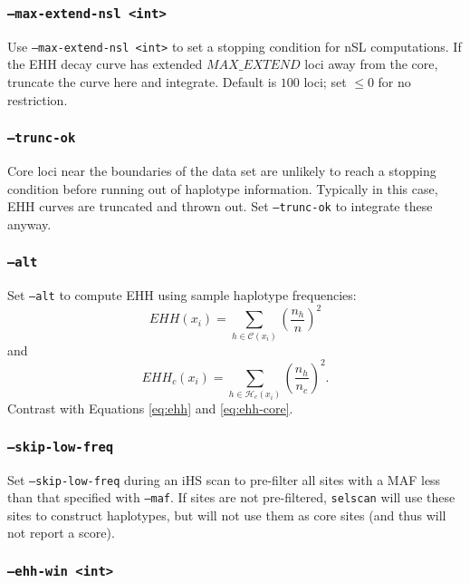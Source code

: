 \documentclass[12pt]{article}%
\begin{document}
\subsubsection{{\tt --max-extend-nsl <int>}}

Use {\tt --max-extend-nsl <int>} to set a stopping condition for nSL computations.  If the EHH decay curve has extended $MAX\_EXTEND$ loci away from the core, truncate the curve here and integrate.  Default is $100$ loci; set $\le 0$ for no restriction.

\subsubsection{{\tt --trunc-ok}}

Core loci near the boundaries of the data set are unlikely to reach a stopping condition before running out of haplotype information.  Typically in this case, EHH curves are truncated and thrown out. Set {\tt --trunc-ok} to integrate these anyway.

\subsubsection{{\tt --alt}}

Set {\tt --alt} to compute EHH using sample haplotype frequencies:
\begin{equation}
EHH(x_i) = \sum_{h \in \mathcal{C}(x_i)} \left(\frac{n_h}{n}\right)^2
\end{equation}
and
\begin{equation}
EHH_c(x_i) = \sum_{h \in \mathcal{H}_c(x_i)} \left(\frac{n_h}{n_c}\right)^2.
\end{equation}
Contrast with Equations \ref{eq:ehh} and \ref{eq:ehh-core}.

\subsubsection{{\tt --skip-low-freq}}

Set {\tt --skip-low-freq} during an iHS scan to pre-filter all sites with a MAF less than that specified with {\tt --maf}.  If sites are not pre-filtered, {\tt selscan} will use these sites to construct haplotypes, but will not use them as core sites (and thus will not report a score).

\subsubsection{{\tt --ehh-win <int>}}
\end{document}
